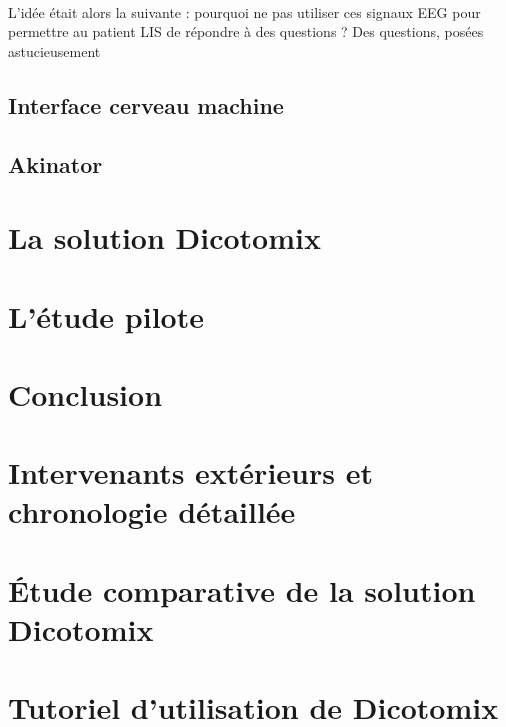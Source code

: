 \documentclass[11pt,a4paper]{article}
\theoremstyle{plain}
\theoremstyle{definition}
\begin{document}
\paragraph{}L'idée était alors la suivante : pourquoi ne pas utiliser ces signaux EEG pour permettre au patient LIS de répondre à des questions ?
Des questions, posées astucieusement 

\subsection{Interface cerveau machine}
\subsection{Akinator}


\section{La solution Dicotomix}
\section{L'étude pilote}
\section{Conclusion}

\appendix
\section{Intervenants extérieurs et chronologie détaillée}
\section{Étude comparative de la solution Dicotomix}

\section{Tutoriel d'utilisation de Dicotomix}

\end{document}
